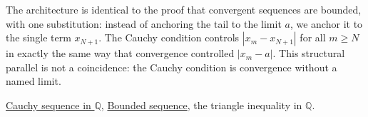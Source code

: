 \begin{remark*}
The architecture is identical to the proof that convergent sequences are bounded,
with one substitution: instead of anchoring the tail to the limit $a$, we anchor
it to the single term $x_{N+1}$.  The Cauchy condition controls
$|x_m - x_{N+1}|$ for all $m \geq N$ in exactly the same way that convergence
controlled $|x_m - a|$.  This structural parallel is not a coincidence: the
Cauchy condition is convergence without a named limit.
\end{remark*}

\begin{dependencies}
\hyperref[def:cauchy-rational]{Cauchy sequence in $\mathbb{Q}$},
\hyperref[def:bounded-sequence-q]{Bounded sequence},
the triangle inequality in $\mathbb{Q}$.
\end{dependencies}
